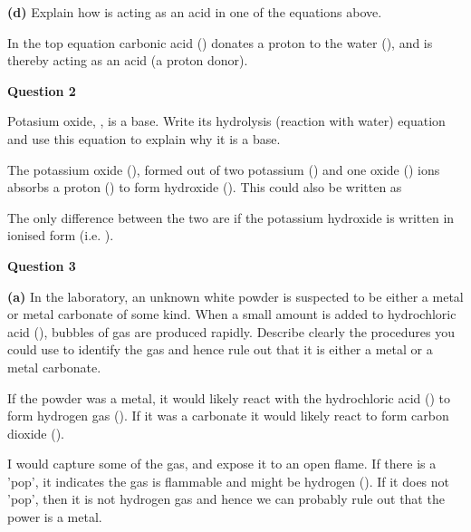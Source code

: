 \documentclass{article}
\begin{document}
{\textbf{(d)} Explain how  is acting as an acid in one of the equations above.
\vspace{0.2cm}

{\color{red}
In the top equation carbonic acid () donates a proton to the water (), and is thereby acting as an acid (a proton donor).
}

\vspace{0.2cm}
\hspace{1cm}
\textbf{Question 2} 
\vspace{0.2cm}

Potasium oxide, , is a base. Write its hydrolysis (reaction with water) equation and use this equation to explain why it is a base.
\vspace{0.2cm}

{\color{red}
\begin{center}
\end{center}

The potassium oxide (), formed out of two potassium () and one oxide () ions absorbs a proton () to form hydroxide (). This could also be written as 

\begin{center}
\end{center}

The only difference between the two are if the potassium hydroxide is written in ionised form (i.e. ).
}


\pagebreak
\vspace{0.2cm}
\hspace{1cm}
\textbf{Question 3} 
\vspace{0.2cm}

\textbf{(a)} In the laboratory, an unknown white powder is suspected to be either a metal or metal carbonate of some kind. When a small amount is added to hydrochloric acid (), bubbles of gas are produced rapidly. Describe clearly the procedures you could use to identify the gas and hence rule out that it is either a metal or a metal carbonate.
\vspace{0.2cm}

{\color{red}
If the powder was a metal, it would likely react with the hydrochloric acid () to form hydrogen gas (). If it was a carbonate it would likely react to form carbon dioxide ().

I would capture some of the gas, and expose it to an open flame. If there is a 'pop', it indicates the gas is flammable and might be hydrogen (). If it does not 'pop', then it is not hydrogen gas and hence we can probably rule out that the power is a metal.

}}
\end{document}
